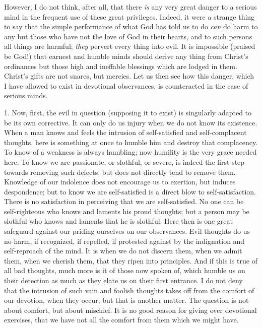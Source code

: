 However, I do not think, after all, that there \emph{is} any very
great danger to a serious mind in the frequent use of these great
privileges. Indeed, it were a strange thing to say that the simple
performance of what God has told us to do \emph{can} do harm to any
but those who have not the love of God in their hearts, and to such
persons all things are harmful; \emph{they} pervert every thing into
evil. It is impossible (praised be God!) that earnest and humble minds
should derive any thing from Christ's ordinances but those high and
ineffable blessings which are lodged in them. Christ's gifts are not
snares, but mercies. Let us then see how this danger, which I have
allowed to exist in devotional observances, is counteracted in the
case of serious minds.

1. Now, first, the evil in question (supposing it to exist) is
singularly adapted to be its own corrective. It can only do us injury
when we do not know its existence. When a man knows and feels the
intrusion of self-satisfied and self-complacent thoughts, here is
something at once to humble him and destroy that complacency. To know
of a weakness is always humbling; now humility is the very grace
needed here. To know we are passionate, or slothful, or severe, is
indeed the first step towards removing such defects, but does not
directly tend to remove them. Knowledge of our indolence does not
encourage us to exertion, but induces despondence; but to know we are
self-satisfied is a direct blow to self-satisfaction. There is no
satisfaction in perceiving that we are self-satisfied. No one can be
self-righteous who knows and laments his proud thoughts; but a person
may be slothful who knows and laments that he is slothful. Here then
is one great safeguard against our priding ourselves on our
observances. Evil thoughts do us no harm, if recognized, if repelled,
if protested against by the indignation and self-reproach of the mind.
It is when we do not discern them, when we admit them, when we cherish
them, that they ripen into principles. And if this is true of all bad
thoughts, much more is it of those now spoken of, which humble us on
their detection as much as they elate us on their first entrance. I do
not deny that the intrusion of such vain and foolish thoughts takes
off from the comfort of our devotion, when they occur; but that is
another matter. The question is not about comfort, but about mischief.
It is no good reason for giving over devotional exercises, that we
have not all the comfort from them which we might have.

